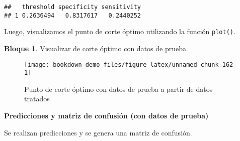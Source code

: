 \documentclass[
]{book}
\newenvironment{Shaded}{\begin{snugshade}}{\end{snugshade}}
\newcommand{\AttributeTok}[1]{\textcolor[rgb]{0.77,0.63,0.00}{#1}}
\newcommand{\ConstantTok}[1]{\textcolor[rgb]{0.00,0.00,0.00}{#1}}
\newcommand{\DecValTok}[1]{\textcolor[rgb]{0.00,0.00,0.81}{#1}}
\newcommand{\FloatTok}[1]{\textcolor[rgb]{0.00,0.00,0.81}{#1}}
\newcommand{\FunctionTok}[1]{\textcolor[rgb]{0.00,0.00,0.00}{#1}}
\newcommand{\NormalTok}[1]{#1}
\newcommand{\OtherTok}[1]{\textcolor[rgb]{0.56,0.35,0.01}{#1}}
\newcommand{\SpecialCharTok}[1]{\textcolor[rgb]{0.00,0.00,0.00}{#1}}
\newcommand{\StringTok}[1]{\textcolor[rgb]{0.31,0.60,0.02}{#1}}
\theoremstyle{definition}
\theoremstyle{definition}
\newtheorem{example}{Bloque}[chapter]
\theoremstyle{definition}
\theoremstyle{definition}
\theoremstyle{remark}
\begin{document}
\begin{verbatim}
##   threshold specificity sensitivity
## 1 0.2636494   0.8317617   0.2440252
\end{verbatim}

\begin{Shaded}
\end{Shaded}

Luego, visualizamos el punto de corte óptimo utilizando la función \texttt{plot()}.

\begin{example}
\protect\hypertarget{exm:bloque89nbm}{}\label{exm:bloque89nbm}Visualizar de corte óptimo con datos de prueba
\end{example}

\begin{Shaded}
\end{Shaded}

\begin{figure}
\texttt{[image: bookdown-demo\_files/figure-latex/unnamed-chunk-162-1]} \caption{Punto de corte óptimo con datos de prueba a partir de datos tratados}\label{fig:unnamed-chunk-162}
\end{figure}

\textbf{Predicciones y matriz de confusión (con datos de prueba)}

Se realizan predicciones y se genera una matriz de confusión.
\end{document}
